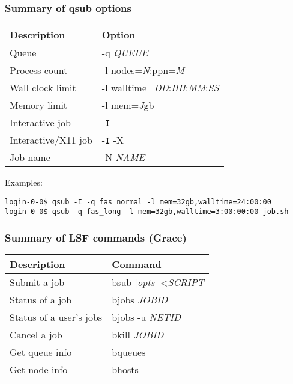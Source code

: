 \documentclass[10pt]{beamer}
\begin{document}
\begin{frame}[fragile]
\frametitle{Summary of qsub options}
\begin{tabular}{|l|l|}
\hline
\textbf{Description} & \textbf{Option} \\
\hline
Queue & -q \textit{QUEUE} \\
\hline
Process count & -l nodes=\textit{N}:ppn=\textit{M} \\
\hline
Wall clock limit & -l walltime=\textit{DD}:\textit{HH}:\textit{MM}:\textit{SS} \\
\hline
Memory limit & -l mem=\textit{J}gb \\
\hline
Interactive job & -\texttt{I} \\
\hline
Interactive/X11 job & -\texttt{I} -X \\
\hline
Job name & -N \textit{NAME} \\
\hline
\end{tabular}

\vskip10pt
Examples:
\begin{verbatim}
login-0-0$ qsub -I -q fas_normal -l mem=32gb,walltime=24:00:00
login-0-0$ qsub -q fas_long -l mem=32gb,walltime=3:00:00:00 job.sh
\end{verbatim}
\end{frame}

\begin{frame}
\frametitle{Summary of LSF commands (Grace)}
\begin{tabular}{|l|l|}
\hline
\textbf{Description} & \textbf{Command} \\
\hline
Submit a job & bsub [\textit{opts}] \textless \textit{SCRIPT} \\
\hline
Status of a job & bjobs \textit{JOBID} \\
\hline
Status of a user's jobs & bjobs -u \textit{NETID} \\
\hline
Cancel a job & bkill \textit{JOBID} \\
\hline
Get queue info & bqueues \\
\hline
Get node info & bhosts \\
\hline
\end{tabular}
\end{frame}
\end{document}
